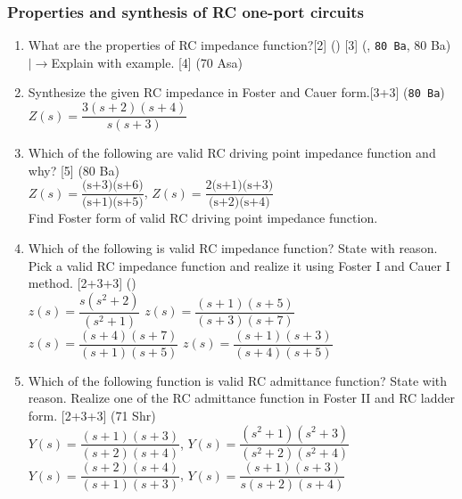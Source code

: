 \documentclass[12pt]{article}
\newcommand{\lb}{\\$\left|\rightarrow\right.$}
\begin{document}
		\subsubsection{Properties and synthesis of RC one-port circuits}
			\begin{enumerate}
				\item What are the properties of RC impedance function?\hfill [2] () [3] (, \texttt{80 Ba}, 80 Ba)
				\lb Explain with example. \hfill [4] (70 Asa)
				
				\item Synthesize the given RC impedance in Foster and Cauer form.\hfill[3+3] (\texttt{80 Ba})\\
				$Z(s) = \dfrac{3(s+2)(s+4)}{s(s+3)}$
				
				\item Which of the following are valid RC driving point impedance function and why? \hfill [5] (80 Ba)\\
				$Z(s) = \dfrac{\text{(s+3)(s+6)}}{\text{(s+1)(s+5)}}$, \hspace{1cm} $Z(s) = \dfrac{\text{2(s+1)(s+3)}}{\text{(s+2)(s+4)}}$\\
				Find Foster form of valid RC driving point impedance function.
				
				\item Which of the following is valid RC impedance function? State with reason. Pick a valid RC impedance function and realize it using Foster I and Cauer I method. \hfill [2+3+3] ()\\
				$z(s) = \dfrac{s(s^2+2)}{(s^2+1)}$ \hspace{2.8cm}
				$z(s) = \dfrac{(s+1)(s+5)}{(s+3)(s+7)}$ \\
				$z(s) = \dfrac{(s+4)(s+7)}{(s+1)(s+5)}$ \hspace{2cm}
				$z(s) = \dfrac{(s+1)(s+3)}{(s+4)(s+5)}$ 
				
				\item Which of the following function is valid RC admittance function? State with reason. Realize one of the RC admittance function in Foster II and RC ladder form. \hfill [2+3+3] (71 Shr)\\
				$Y(s) = \dfrac{(s+1)(s+3)}{(s+2)(s+4)}$, \hspace{2cm}
				$Y(s) = \dfrac{(s^2+1)(s^2+3)}{(s^2+2)(s^2+4)}$\\
				$Y(s) = \dfrac{(s+2)(s+4)}{(s+1)(s+3)}$, \hspace{2cm}
				$Y(s) = \dfrac{(s+1)(s+3)}{s(s+2)(s+4)}$
			\end{enumerate}
\end{document}
